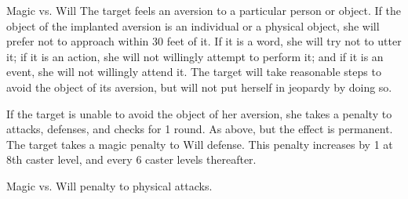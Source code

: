 \begin{spellheader}
    \spellrng{\rngmed}
\end{spellheader}
\begin{spelleffects}
    \begin{spellattack}{Magic vs. Will}
        \spellsuccess The target feels an aversion to a particular person or object. If the object of the implanted aversion is an individual or a physical object, she will prefer not to approach within 30 feet of it. If it is a word, she will try not to utter it; if it is an action, she will not willingly attempt to perform it; and if it is an event, she will not willingly attend it. The target will take reasonable steps to avoid the object of its aversion, but will not put herself in jeopardy by doing so.
        \par If the target is unable to avoid the object of her aversion, she takes a  penalty to attacks, defenses, and checks for 1 round.
        \spellcritical As above, but the effect is permanent.
        \spellfailure The target takes a  magic penalty to Will defense. This penalty increases by 1 at 8th caster level, and every 6 caster levels thereafter.
    \end{spellattack}
\end{spelleffects}
\begin{spellfooter}

\end{spellfooter}

\begin{comment}
\subsubsection{B}
\end{comment}

\begin{spellheader}
\end{spellheader}
\begin{spelleffects}
    \begin{spellattack}{Magic vs. Will}
        \spellsuccess {} penalty to physical attacks.
    \end{spellattack}
\end{spelleffects}
\begin{spellfooter}

\end{spellfooter}

